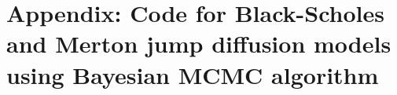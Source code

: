 \documentclass[11pt,reqno,final]{amsart}
\begin{document}
%
%
\newpage


%
%
\newpage
\section*{Appendix: Code for Black-Scholes and Merton jump diffusion models using Bayesian MCMC algorithm}

\end{document}

